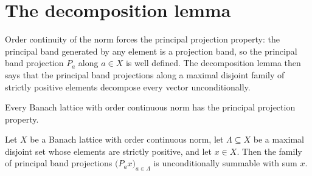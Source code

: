 \section{The decomposition lemma}

Order continuity of the norm forces the principal projection
property: the principal band generated by any element is a
projection band, so the principal band projection $P_a$ along
$a \in X$ is well defined. The decomposition lemma then says
that the principal band projections along a maximal disjoint
family of strictly positive elements decompose every vector
unconditionally.

\begin{lemma}
\label{lem:hasPrincipalProjectionProperty-of-isOrderContinuousNorm}
\leanok
{}
Every Banach lattice with order continuous norm has the
principal projection property.
\end{lemma}

\begin{theorem}
\label{thm:hasSum-principalBandProjection}
\leanok
{}
Let $X$ be a Banach lattice with order continuous norm, let
$\Lambda \subseteq X$ be a maximal disjoint set whose elements
are strictly positive, and let $x \in X$. Then the family of
principal band projections $\bigl( P_a x \bigr)_{a \in \Lambda}$
is unconditionally summable with sum $x$.
\end{theorem}
